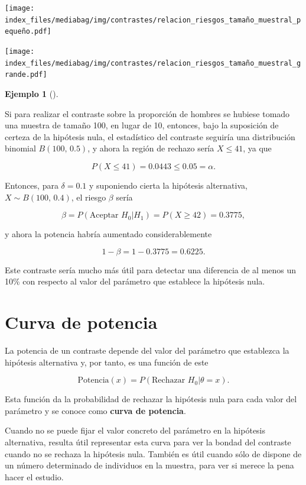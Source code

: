 \documentclass[
  a4paper,
]{scrreport}
\theoremstyle{plain}
\theoremstyle{definition}
\theoremstyle{definition}
\newtheorem{example}{Ejemplo}[chapter]
\theoremstyle{remark}
\begin{document}
\begin{center}
\texttt{[image: index\_files/mediabag/img/contrastes/relacion\_riesgos\_tamaño\_muestral\_pequeño.pdf]}
\end{center}

\begin{center}
\texttt{[image: index\_files/mediabag/img/contrastes/relacion\_riesgos\_tamaño\_muestral\_grande.pdf]}
\end{center}

\begin{example}[]\protect\hypertarget{exm-relacion-riesgos-tamaño-muestral}{}\label{exm-relacion-riesgos-tamaño-muestral}

Si para realizar el contraste sobre la proporción de hombres se hubiese
tomado una muestra de tamaño 100, en lugar de 10, entonces, bajo la
suposición de certeza de la hipótesis nula, el estadístico del contraste
seguiría una distribución binomial \(B(100,\,0.5)\), y ahora la región
de rechazo sería \(X\leq 41\), ya que

\[P(X\leq 41) = 0.0443 \leq 0.05 =\alpha.\]

Entonces, para \(\delta=0.1\) y suponiendo cierta la hipótesis
alternativa, \(X\sim B(100,\,0.4)\), el riesgo \(\beta\) sería

\[\beta = P(\mbox{Aceptar }H_0|H_1) = P(X\geq 42) = 0.3775,\]

y ahora la potencia habría aumentado considerablemente

\[1-\beta = 1-0.3775 = 0.6225.\]

Este contraste sería mucho más útil para detectar una diferencia de al
menos un 10\% con respecto al valor del parámetro que establece la
hipótesis nula.

\end{example}

\section{Curva de potencia}\label{curva-de-potencia}

La potencia de un contraste depende del valor del parámetro que
establezca la hipótesis alternativa y, por tanto, es una función de este

\[\mbox{Potencia}(x)= P(\mbox{Rechazar }H_0|\theta=x).\]

Esta función da la probabilidad de rechazar la hipótesis nula para cada
valor del parámetro y se conoce como \textbf{curva de potencia}.

Cuando no se puede fijar el valor concreto del parámetro en la hipótesis
alternativa, resulta útil representar esta curva para ver la bondad del
contraste cuando no se rechaza la hipótesis nula. También es útil cuando
sólo de dispone de un número determinado de individuos en la muestra,
para ver si merece la pena hacer el estudio.
\end{document}
